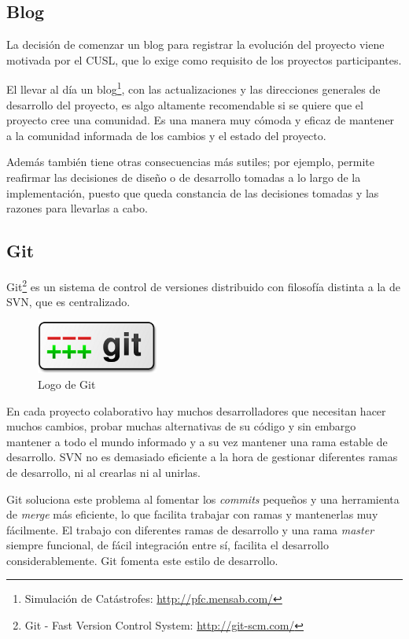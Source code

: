 \subsection*{Blog}

La decisión de comenzar un blog para registrar la evolución del proyecto viene
motivada por el CUSL, que lo exige como requisito de los proyectos
participantes.

El llevar al día un blog\footnote{Simulación de Catástrofes:
\url{http://pfc.mensab.com/}}, con las actualizaciones y las direcciones
generales de desarrollo del proyecto, es algo altamente recomendable si se
quiere que el proyecto cree una comunidad. Es una manera muy cómoda y eficaz de
mantener a la comunidad informada de los cambios y el estado del proyecto.

Además también tiene otras consecuencias más sutiles; por ejemplo, permite
reafirmar las decisiones de diseño o de desarrollo tomadas a lo largo de la
implementación, puesto que queda constancia de las decisiones tomadas y las
razones para llevarlas a cabo.

\subsection*{Git}

Git\footnote{Git - Fast Version Control System: \url{http://git-scm.com/}} es
un sistema de control de versiones distribuido con filosofía distinta a la de
SVN, que es centralizado.

\begin{figure}[H]
 \centering
 \includegraphics[width=40mm]{figuras/cap5/git.png}
 \caption{Logo de Git}
\end{figure}

En cada proyecto colaborativo hay muchos desarrolladores que necesitan hacer
muchos cambios, probar muchas alternativas de su código y sin embargo mantener
a todo el mundo informado y a su vez mantener una rama estable de desarrollo.
SVN no es demasiado eficiente a la hora de gestionar diferentes ramas de
desarrollo, ni al crearlas ni al unirlas.

Git soluciona este problema al fomentar los {\em commits} pequeños y una
herramienta de {\em merge} más eficiente, lo que facilita trabajar con ramas y
mantenerlas muy fácilmente. El trabajo con diferentes ramas de desarrollo y
una rama {\em master} siempre funcional, de fácil integración entre sí, facilita
el desarrollo considerablemente. Git fomenta este estilo de desarrollo.

